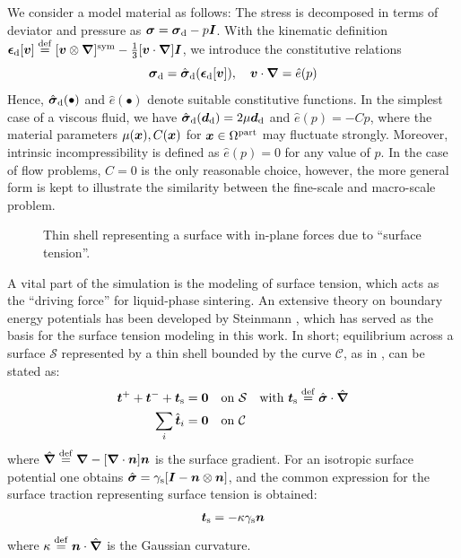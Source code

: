 \documentclass[MikaelDissertation.tex]{subfiles}
\begin{document}
We consider a model material as follows: The stress is decomposed in terms of deviator and pressure as $\boldsymbol{\sigma} = \boldsymbol{\sigma}_{\mathrm{d}} - p\boldsymbol{I}$.
With the kinematic definition $\boldsymbol{\epsilon}_{\mathrm{d}}[\boldsymbol{v}]\overset{\mathrm{def}}{=}[\boldsymbol{v}\mathbin{\otimes}\boldsymbol{\nabla}]^{\mathrm{sym}}-\frac{1}{3}[\boldsymbol{v}\cdot\boldsymbol{\nabla}]\boldsymbol{I}$, we introduce the constitutive relations
\begin{equation}
    \boldsymbol{\sigma}_{\mathrm{d}} = \hat{\boldsymbol{\sigma}}_{\mathrm{d}}(\boldsymbol{\epsilon}_{\mathrm{d}}[\boldsymbol{v}]), \quad
    \boldsymbol{v}\cdot\boldsymbol{\nabla} = \hat{e}(p)
\label{eq201}
\end{equation}
Hence, $\hat{\boldsymbol{\sigma}}_{\mathrm{d}}(\bullet)$ and $\hat{e}(\bullet)$ denote suitable constitutive functions.
In the simplest case of a viscous fluid, we have $\hat{\boldsymbol{\sigma}}_{\mathrm{d}}(\boldsymbol{d}_{\mathrm{d}})=2\mu\boldsymbol{d}_{\mathrm{d}}$ and $\hat{e}(p)=- C p$, where the material parameters $\mu(\boldsymbol{x}), C(\boldsymbol{x})$ for $\boldsymbol{x}\in\Omega^{\mathrm{part}}$ may fluctuate strongly.
Moreover, intrinsic incompressibility is defined as $\hat{e}(p)=0$ for any value of $p$.
In the case of flow problems, $C = 0$ is the only reasonable choice, however, the more general form is kept to illustrate the similarity between the fine-scale and macro-scale problem.

\begin{figure}[th!]
    \centering
    
    \caption{Thin shell representing a surface with in-plane forces due to ``surface tension''.}
    \label{fig:surfacestress}
\end{figure}
A vital part of the simulation is the modeling of surface tension, which acts as the ``driving force'' for liquid-phase sintering.
An extensive theory on boundary energy potentials has been developed by Steinmann \cite{steinmann_boundary_2008}, which has served as the basis for the surface tension modeling in this work.
In short; equilibrium across a surface $\mathcal{S}$ represented by a thin shell bounded by the curve $\mathcal{C}$, as in , can be stated as:
\begin{align}
    \boldsymbol{t}^+ + \boldsymbol{t}^- + \boldsymbol{t}_{\mathrm{s}} &= \boldsymbol{0} \quad \text{on} \,\, \mathcal{S} \quad \text{with } \boldsymbol{t}_{\mathrm{s}} \overset{\mathrm{def}}{=} \hat{\boldsymbol{\sigma}}\cdot\hat{\boldsymbol{\nabla}}
\label{eq103KR}\\
    \sum_i \hat{\boldsymbol{t}}_i &= \boldsymbol{0} \quad \text{on} \,\, \mathcal{C}
\label{eq104KR}
\end{align}
where $\hat{\boldsymbol{\nabla}} \overset{\mathrm{def}}{=} \boldsymbol{\nabla} - [\boldsymbol{\nabla}\cdot\boldsymbol{n}]\boldsymbol{n}$ is the surface gradient.
For an isotropic surface potential one obtains $\hat{\boldsymbol{\sigma}} = \gamma_{\mathrm{s}}[\boldsymbol{I}-\boldsymbol{n}\mathbin{\otimes}\boldsymbol{n}]$, and the common expression for the surface traction representing surface tension is obtained:
\begin{align}
 \boldsymbol{t}_{\mathrm{s}} = -\kappa \gamma_{\mathrm{s}} \boldsymbol{n}
\end{align}
where $\kappa \overset{\mathrm{def}}{=} \boldsymbol{n} \cdot\hat{\boldsymbol{\nabla}}$ is the Gaussian curvature.
\end{document}
